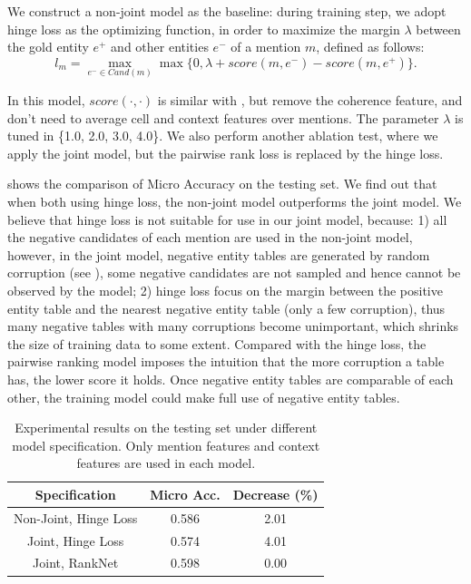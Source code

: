 We construct a non-joint model as the baseline: during training step, we adopt hinge loss
as the optimizing function, in order to maximize the margin $\lambda$ between the gold entity $e^+$
and other entities $e^-$ of a mention $m$, defined as follows:
\begin{equation}
\label{eqn:hinge-loss}
l_m = \max_{e^- \in Cand(m)} \max \{ 0, \lambda + score(m, e^-) - score(m, e^+) \}.
\end{equation}

\noindent
In this model,  $score(\cdot, \cdot)$ is similar with ,
but remove the coherence feature, and don't need to average cell and context features over mentions.
The parameter $\lambda$ is tuned in \{1.0, 2.0, 3.0, 4.0\}.
We also perform another ablation test, where we apply the joint model,
but the pairwise rank loss is replaced by the hinge loss.

 shows the comparison of Micro Accuracy on the testing set.
We find out that when both using hinge loss, the non-joint model outperforms
the joint model.
We believe that hinge loss is not suitable for use in our joint model,
because: 1) all the negative candidates of each mention are used in the non-joint model,
however, in the joint model, negative entity tables are generated by random corruption (see ),
some negative candidates are not sampled and hence cannot be observed by the model;
2) hinge loss focus on the margin between the positive entity table and the nearest negative entity
table (only a few corruption), thus many negative tables with many corruptions become unimportant,
which shrinks the size of training data to some extent.
Compared with the hinge loss, the pairwise ranking model imposes the intuition
that the more corruption a table has, the lower score it holds.
Once negative entity tables are comparable of each other, the training model
could make full use of negative entity tables.

\begin{table}[ht]
    \centering
    \caption{Experimental results on the testing set under different model specification.
             Only mention features and context features are used in each model.}
    \label{tab:ablation-joint}
    \begin{tabular} {c|c|c}
        Specification &   Micro Acc.  & Decrease (\%) \\
        \hline
        Non-Joint, Hinge Loss &   0.586        &  2.01     \\
        Joint, Hinge Loss     &   0.574        &  4.01     \\
        Joint, RankNet        &   0.598        &  0.00     \\
    \end{tabular}
\end{table}



%
%
%

